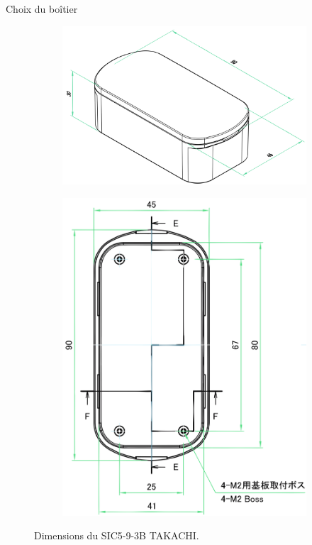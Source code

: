 \documentclass{beamer}
\begin{document}
\begin{frame}{Choix du boîtier}
	\begin{figure}[h]
		\centering
		\begin{subfigure}[b]{0.6\textwidth}
			\centering
			\includegraphics[width=\textwidth]{../figures/dev-pcb/boitier-dim}
		\end{subfigure}
		\hfill
		\begin{subfigure}[b]{0.35\textwidth}
			\centering
			\includegraphics[width=\textwidth]{../figures/dev-pcb/boitier-dims-pcb}
		\end{subfigure}
		\caption{Dimensions du SIC5-9-3B TAKACHI.}
	\end{figure}
\end{frame}
\end{document}
